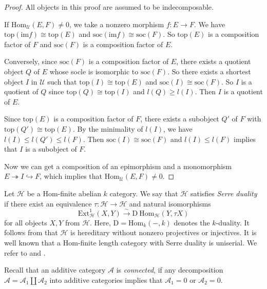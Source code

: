 \documentclass[a4paper, 11pt, reqno]{amsart}
\numberwithin{equation}{section}
\theoremstyle{remark}
\theoremstyle{definition}
\begin{document}
\begin{proof}
   All objects in this proof are assumed to be indecomposable. 
   
   If $\mathrm{Hom}_{\mathcal U}(E,F) \neq 0$, we take a nonzero morphism $f: E \to F$. We have $\mathrm{top}(\mathrm{im} f) \cong \mathrm{top}(E)$ and $\mathrm{soc}(\mathrm{im} f) \cong \mathrm{soc}(F)$. So $\mathrm{top}(E)$ is a composition factor of $F$ and $\mathrm{soc}(F)$ is a composition factor of $E$. 
   
   Conversely, since $\mathrm{soc}(F)$ is a composition factor of $E$, there exists a quotient object $Q$ of $E$ whose socle is isomorphic to $\mathrm{soc}(F)$. So there exists a shortest object $I$ in $\mathcal U$ such that $\mathrm{top}(I)\cong \mathrm{top}(E)$ and $\mathrm{soc}(I)\cong \mathrm{soc}(F)$. So $I$ is a quotient of $Q$ since $\mathrm{top}(Q) \cong \mathrm{top}(I)$ and $l(Q) \geq l(I)$. Then $I$ is a quotient of $E$. 
   
   Since $\mathrm{top}(E)$ is a composition factor of $F$, there exists a subobject $Q'$ of $F$ with $\mathrm{top}(Q') \cong \mathrm{top}(E)$. By the minimality of $l(I)$, we have $l(I) \leq l(Q') \leq l(F)$. Then $\mathrm{soc}(I) \cong \mathrm{soc}(F)$ and $l(I) \leq l(F)$ implies that $I$ is a subobject of $F$.

   Now we can get a composition of an epimorphism and a monomorphism $E \twoheadrightarrow I \hookrightarrow F$, which implies that $\mathrm{Hom}_{\mathcal U}(E,F) \neq 0$.
\end{proof}

Let $\mathcal H$ be a Hom-finite abelian $k$ category. We say that $\mathcal H$ satisfies \emph{Serre duality} if there exist an equivalence $\tau: \mathcal H \to \mathcal H$ and natural isomorphisms
\[
\mathrm{Ext}_{\mathcal H}^1(X,Y) \xrightarrow{\sim} \mathrm{D \ Hom}_{\mathcal H}(Y, \tau X)
\]
for all objects $X,Y$ from $\mathcal H$. Here, $\mathrm{D}=\mathrm{Hom}_k(-,k)$ denotes the $k$-duality. It follows from \cite[Proposition~1.4]{lenzing2006hereditary} that $\mathcal H$ is hereditary without nonzero projectives or injectives. It is well known that a Hom-finite length category with Serre duality is uniserial. We refer to \cite[Theorem 1.7]{lenzing2006hereditary} and \cite[Proposition 8.3]{gabriel1973indecomposable}.

Recall that an additive category $\mathcal A$ is \emph{connected}, if any decomposition $\mathcal A=\mathcal A_1 \coprod \mathcal A_2$ into additive categories implies that $\mathcal A_1=0$ or $\mathcal A_2=0$. 
\end{document}
